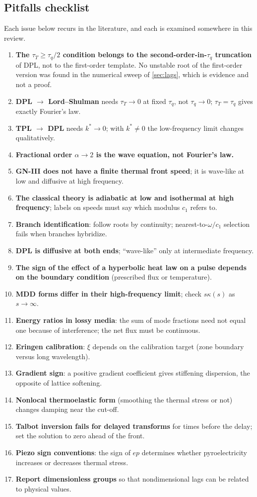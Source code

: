 \subsection{Pitfalls checklist}
Each issue below recurs in the literature, and each is examined somewhere in this review.
\begin{enumerate}
\item \textbf{The $\tau_T\ge\tau_q/2$ condition belongs to the second-order-in-$\tau_q$ truncation} of DPL, not to the first-order template. No unstable root of the first-order version was found in the numerical sweep of \cref{sec:lags}, which is evidence and not a proof.
\item \textbf{DPL $\to$ Lord--Shulman} needs $\tau_T\to0$ at fixed $\tau_q$, not $\tau_q\to0$; $\tau_T=\tau_q$ gives exactly Fourier's law.
\item \textbf{TPL $\to$ DPL} needs $k^*\to0$; with $k^*\ne0$ the low-frequency limit changes qualitatively.
\item \textbf{Fractional order $\alpha\to2$ is the wave equation, not Fourier's law.}
\item \textbf{GN-III does not have a finite thermal front speed}; it is wave-like at low and diffusive at high frequency.
\item \textbf{The classical theory is adiabatic at low and isothermal at high frequency}; labels on speeds must say which modulus $c_1$ refers to.
\item \textbf{Branch identification}: follow roots by continuity; nearest-to-$\omega/c_1$ selection fails when branches hybridize.
\item \textbf{DPL is diffusive at both ends}; ``wave-like'' only at intermediate frequency.
\item \textbf{The sign of the effect of a hyperbolic heat law on a pulse depends on the boundary condition} (prescribed flux or temperature).
\item \textbf{MDD forms differ in their high-frequency limit}; check $s\kappa(s)$ as $s\to\infty$.
\item \textbf{Energy ratios in lossy media}: the sum of mode fractions need not equal one because of interference; the net flux must be continuous.
\item \textbf{Eringen calibration}: $\xi$ depends on the calibration target (zone boundary versus long wavelength).
\item \textbf{Gradient sign}: a positive gradient coefficient gives stiffening dispersion, the opposite of lattice softening.
\item \textbf{Nonlocal thermoelastic form} (smoothing the thermal stress or not) changes damping near the cut-off.
\item \textbf{Talbot inversion fails for delayed transforms} for times before the delay; set the solution to zero ahead of the front.
\item \textbf{Piezo sign conventions}: the sign of $ep$ determines whether pyroelectricity increases or decreases thermal stress.
\item \textbf{Report dimensionless groups} so that nondimensional lags can be related to physical values.
\end{enumerate}


